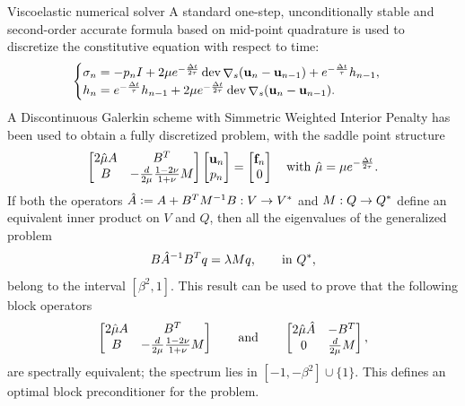 \documentclass[final]{beamer}
\newlength{\onecolwid}
\DeclareMathOperator{\grad}{\nabla}
\DeclareMathOperator{\dev}{dev}
\begin{document}
\begin{frame}[t]
\begin{columns}[t]
\begin{column}{\onecolwid}
\begin{block}{Viscoelastic numerical solver}
A standard one-step, unconditionally stable and second-order accurate formula
based on mid-point quadrature is used to discretize the constitutive equation
with respect to time:
\[
  \begin{cases}
  \tensor{\sigma}_n = -p_n \tensor{I} +
    2 \mu e^{-\frac{\Delta t}{2\tau}} \dev \grad_s (\vec{u}[n]-\vec{u}[n-1]) +
    e^{-\frac{\Delta t}{\tau}} \tensor{h}_{n-1}, \\
    \tensor{h}_{n} = e^{-\frac{\Delta t}{\tau}} \tensor{h}_{n-1} +
      2 \mu e^{-\frac{\Delta t}{2\tau}} \dev \grad_s (\vec{u}[n]-\vec{u}[n-1]).
  \end{cases}
\]
A Discontinuous Galerkin scheme with Simmetric Weighted Interior Penalty
has been used to obtain a fully discretized problem, with the saddle point
structure
\[
  \begin{bmatrix}
    2 \hat{\mu} A & \adj{B} \\
    B & -\frac{d}{2\mu} \frac{1-2\nu}{1+\nu} M
  \end{bmatrix}
  \begin{bmatrix}\vec{u}[n] \\ p_n\end{bmatrix} =
  \begin{bmatrix}\vec{f}[n] \\ 0\end{bmatrix}
  \quad\text{with } \hat{\mu} = \mu e^{-\frac{\Delta t}{2\tau}}.
\]
If both the operators $\hat{A}\mathrel{\mathop:}= A + B^TM^{-1}B: V \to V^*$ and
$M:Q \to Q^*$ define an equivalent inner product on $V$ and $Q$, then all
the eigenvalues of the generalized problem
\[
  B\hat{A}^{-1}B^Tq = \lambda Mq, \qquad\text{in }Q^*,
\]
belong to the interval $[\beta^2,1]$. This result can be used to prove that the
following block operators
\[
  \begin{bmatrix}
    2\hat{\mu}A & B^T \\
    B & -\frac{d}{2\mu} \frac{1-2\nu}{1+\nu} M
  \end{bmatrix}
  \qquad\text{and}\qquad
  \begin{bmatrix}
    2\hat{\mu} \hat{A} & -B^T \\
    0 & \frac{d}{2\mu}M
  \end{bmatrix},
\]
are spectrally equivalent; the spectrum lies in $[-1, -\beta^2] \cup \{1\}$.
This defines an optimal block preconditioner for the problem.
\end{block}


\end{column}
\end{columns}
\end{frame}
\end{document}
